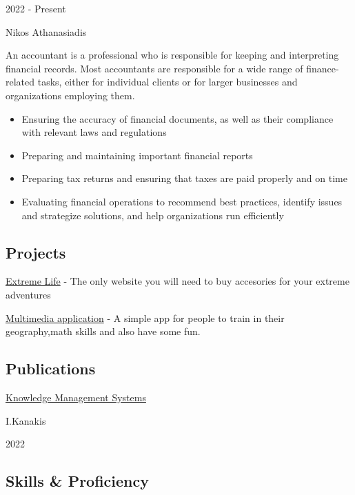 \documentclass[
]{article}
\providecommand{\tightlist}{%
  \setlength{\itemsep}{0pt}\setlength{\parskip}{0pt}}
\begin{document}
2022 - Present

Nikos Athanasiadis

An accountant is a professional who is responsible for keeping and
interpreting financial records. Most accountants are responsible for a
wide range of finance-related tasks, either for individual clients or
for larger businesses and organizations employing them.

\begin{itemize}
\tightlist
\item
  Ensuring the accuracy of financial documents, as well as their
  compliance with relevant laws and regulations
\item
  Preparing and maintaining important financial reports
\item
  Preparing tax returns and ensuring that taxes are paid properly and on
  time
\item
  Evaluating financial operations to recommend best practices, identify
  issues and strategize solutions, and help organizations run
  efficiently
\end{itemize}

\hypertarget{projects}{%
\subsection{\texorpdfstring{{ \emph{} \emph{} }
Projects}{    Projects}}\label{projects}}

{ \protect\hyperlink{hook}{Extreme Life} } - {The only website you will
need to buy accesories for your extreme adventures}

{
\protect\hyperlink{https:ux2fux2fscratch.mit.eduux2fprojectsux2f593350398ux2f}{Multimedia
application} } - {A simple app for people to train in their
geography,math skills and also have some fun.}

\hypertarget{publications}{%
\subsection{\texorpdfstring{{ \emph{} \emph{} }
Publications}{    Publications}}\label{publications}}

\protect\hyperlink{}{Knowledge Management Systems}

I.Kanakis

2022

\hypertarget{skills-proficiency}{%
\subsection{\texorpdfstring{{ \emph{} \emph{} } Skills \&
Proficiency}{    Skills \& Proficiency}}\label{skills-proficiency}}
\end{document}
